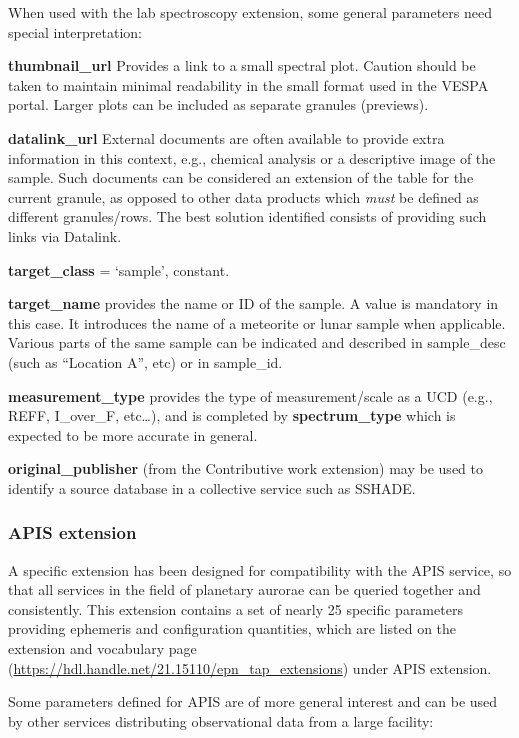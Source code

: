 \documentclass[11pt,a4paper]{ivoa}
\begin{document}
When used with the lab spectroscopy extension, some general parameters
need special interpretation:

\textbf{thumbnail\_url} Provides a link to a small spectral plot.
Caution should be taken to maintain minimal readability in the small format
used in the VESPA portal. Larger plots can be included as separate granules
(previews).

\textbf{datalink\_url} External documents are often available to provide
extra information in this context, e.g., chemical analysis or a descriptive
image of the sample. Such documents can be considered an extension of the
table for the current granule, as opposed to other data products which
\emph{must} be defined as different granules/rows. The best solution
identified consists of providing such links via Datalink.

\textbf{target\_class} = `sample', constant.

\textbf{target\_name} provides the name or ID of the sample.  A value
is mandatory in this case. It introduces the name of a meteorite or
lunar sample when applicable. Various parts of the same sample can be
indicated and described in sample\_desc (such as ``Location A'', etc)
or in sample\_id.

\textbf{measurement\_type} provides the type of measurement/scale as a UCD
(e.g., REFF, I\_over\_F, etc…), and is completed by \textbf{spectrum\_type}
which is expected to be more accurate in general.

\textbf{original\_publisher} (from the Contributive work extension) may be used to identify a source database
in a collective service such as SSHADE.


\subsubsection{APIS extension}

A specific extension has been designed for compatibility with the
APIS service, so that all services in the field of planetary aurorae
can be queried together and consistently.
This extension contains a set of nearly 25 specific parameters
providing ephemeris and configuration quantities, which are listed on the
extension and vocabulary page (\url{https://hdl.handle.net/21.15110/epn_tap_extensions}) under APIS extension.

Some parameters defined for APIS are of more general interest and can
be used by other services distributing observational data from a large facility:
\end{document}
